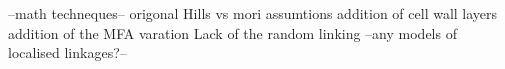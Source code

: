 --math techneques--
origonal Hills vs mori assumtions 
addition of cell wall layers
addition of the MFA varation
Lack of the random linking
--any models of localised linkages?--